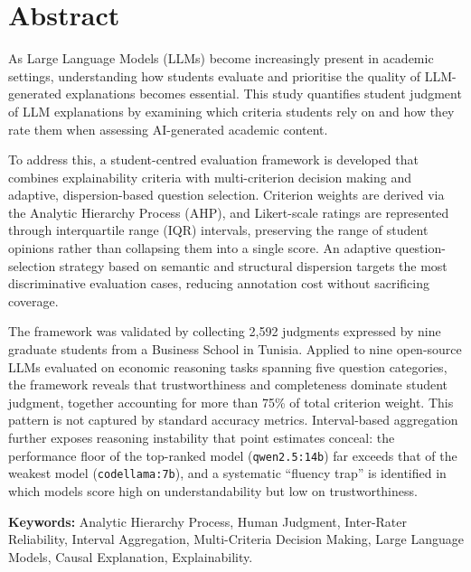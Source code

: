 \chapter*{Abstract}

As Large Language Models (LLMs) become increasingly present in academic settings,
understanding how students evaluate and prioritise the quality of LLM-generated
explanations becomes essential. This study quantifies student judgment of LLM
explanations by examining which criteria students rely on and how they rate them
when assessing AI-generated academic content.

To address this, a student-centred evaluation framework is developed that combines
explainability criteria with multi-criterion decision making and adaptive,
dispersion-based question selection. Criterion weights are derived via the Analytic
Hierarchy Process (AHP), and Likert-scale ratings are represented through
interquartile range (IQR) intervals, preserving the range of student opinions rather
than collapsing them into a single score. An adaptive question-selection strategy
based on semantic and structural dispersion targets the most discriminative evaluation
cases, reducing annotation cost without sacrificing coverage.

The framework was validated by collecting 2{,}592 judgments expressed by nine
graduate students from a Business School in Tunisia. Applied to nine open-source LLMs
evaluated on economic reasoning tasks spanning five question categories, the
framework reveals that trustworthiness and completeness dominate student judgment,
together accounting for more than 75\% of total criterion weight. This pattern is not
captured by standard accuracy metrics. Interval-based aggregation further exposes
reasoning instability that point estimates conceal: the performance floor of the
top-ranked model (\texttt{qwen2.5:14b}) far exceeds that of the weakest model
(\texttt{codellama:7b}), and a systematic ``fluency trap'' is identified in which
models score high on understandability but low on trustworthiness.

\vspace{1em}
\noindent\textbf{Keywords:} Analytic Hierarchy Process, Human Judgment,
Inter-Rater Reliability, Interval Aggregation, Multi-Criteria Decision Making,
Large Language Models, Causal Explanation, Explainability.
